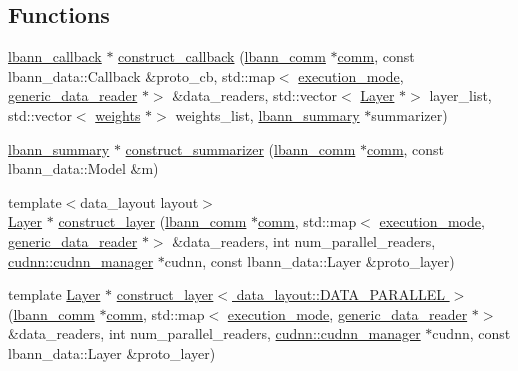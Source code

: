 \subsection*{Functions}
\begin{DoxyCompactItemize}
\item 
\hyperlink{classlbann_1_1lbann__callback}{lbann\+\_\+callback} $\ast$ \hyperlink{namespacelbann_1_1proto_a00597c8b7450c389847980cf6934a619}{construct\+\_\+callback} (\hyperlink{classlbann_1_1lbann__comm}{lbann\+\_\+comm} $\ast$\hyperlink{file__io_8cpp_ab048c6f9fcbcfaa57ce68b00263dbebe}{comm}, const lbann\+\_\+data\+::\+Callback \&proto\+\_\+cb, std\+::map$<$ \hyperlink{base_8hpp_a2781a159088df64ed7d47cc91c4dc0a8}{execution\+\_\+mode}, \hyperlink{classlbann_1_1generic__data__reader}{generic\+\_\+data\+\_\+reader} $\ast$$>$ \&data\+\_\+readers, std\+::vector$<$ \hyperlink{classlbann_1_1Layer}{Layer} $\ast$$>$ layer\+\_\+list, std\+::vector$<$ \hyperlink{classlbann_1_1weights}{weights} $\ast$$>$ weights\+\_\+list, \hyperlink{classlbann_1_1lbann__summary}{lbann\+\_\+summary} $\ast$summarizer)
\item 
\hyperlink{classlbann_1_1lbann__summary}{lbann\+\_\+summary} $\ast$ \hyperlink{namespacelbann_1_1proto_abf0988db9cd58f9ef013588b440c14bd}{construct\+\_\+summarizer} (\hyperlink{classlbann_1_1lbann__comm}{lbann\+\_\+comm} $\ast$\hyperlink{file__io_8cpp_ab048c6f9fcbcfaa57ce68b00263dbebe}{comm}, const lbann\+\_\+data\+::\+Model \&m)
\item 
{\footnotesize template$<$data\+\_\+layout layout$>$ }\\\hyperlink{classlbann_1_1Layer}{Layer} $\ast$ \hyperlink{namespacelbann_1_1proto_a7e4b0a66836712b1713ae4a121453cde}{construct\+\_\+layer} (\hyperlink{classlbann_1_1lbann__comm}{lbann\+\_\+comm} $\ast$\hyperlink{file__io_8cpp_ab048c6f9fcbcfaa57ce68b00263dbebe}{comm}, std\+::map$<$ \hyperlink{base_8hpp_a2781a159088df64ed7d47cc91c4dc0a8}{execution\+\_\+mode}, \hyperlink{classlbann_1_1generic__data__reader}{generic\+\_\+data\+\_\+reader} $\ast$$>$ \&data\+\_\+readers, int num\+\_\+parallel\+\_\+readers, \hyperlink{classlbann_1_1cudnn_1_1cudnn__manager}{cudnn\+::cudnn\+\_\+manager} $\ast$cudnn, const lbann\+\_\+data\+::\+Layer \&proto\+\_\+layer)
\item 
template \hyperlink{classlbann_1_1Layer}{Layer} $\ast$ \hyperlink{namespacelbann_1_1proto_a258c17f551e470e3bcab9f5fa7cf0950}{construct\+\_\+layer$<$ data\+\_\+layout\+::\+D\+A\+T\+A\+\_\+\+P\+A\+R\+A\+L\+L\+E\+L $>$} (\hyperlink{classlbann_1_1lbann__comm}{lbann\+\_\+comm} $\ast$\hyperlink{file__io_8cpp_ab048c6f9fcbcfaa57ce68b00263dbebe}{comm}, std\+::map$<$ \hyperlink{base_8hpp_a2781a159088df64ed7d47cc91c4dc0a8}{execution\+\_\+mode}, \hyperlink{classlbann_1_1generic__data__reader}{generic\+\_\+data\+\_\+reader} $\ast$$>$ \&data\+\_\+readers, int num\+\_\+parallel\+\_\+readers, \hyperlink{classlbann_1_1cudnn_1_1cudnn__manager}{cudnn\+::cudnn\+\_\+manager} $\ast$cudnn, const lbann\+\_\+data\+::\+Layer \&proto\+\_\+layer)
$$
\end{DoxyCompactItemize}
